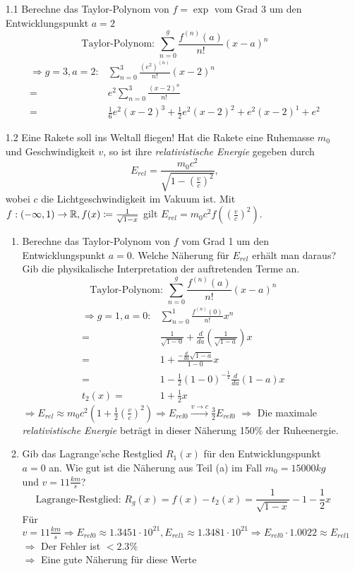 \documentclass{HM}
\begin{document}
	\begin{enumerate}
		\item[1.1] Berechne das Taylor-Polynom von $f=\exp$ vom Grad 3 um den Entwicklungspunkt $a=2$
		 $$\text{Taylor-Polynom: }\sum\limits_{n=0}^g\frac{f^{(n)}(a)}{n!}(x-a)^n$$
		 \begin{align*}
		 	\Rightarrow g=3, a=2: 
		 	&\sum\limits_{n=0}^3\frac{(e^2)^{(n)}}{n!}(x-2)^n\\
		 	=&e^2\sum\limits_{n=0}^3\frac{(x-2)^n}{n!}\\
		 	=&\frac{1}{6}e^2(x-2)^3+\frac{1}{2}e^2(x-2)^2+e^2(x-2)^1+e^2
		 \end{align*}
		 
		 \item[1.2] Eine Rakete soll ins Weltall fliegen! Hat die Rakete eine Ruhemasse $m_0$ und Geschwindigkeit $v$, so ist ihre \textit{relativistische Energie} gegeben durch
		 $$E_{rel}=\frac{m_0c^2}{\sqrt{1-(\frac{v}{c})^2}},$$
		 wobei $c$ die Lichtgeschwindigkeit im Vakuum ist. Mit $f: (-\infty,1)\to\mathbb{R}, f(x)\coloneqq\frac{1}{\sqrt{1-x}}$ gilt $E_{rel}=m_0c^2f((\frac{v}{c})^2)$.
		 \begin{enumerate}
		 	\item Berechne das Taylor-Polynom von $f$ vom Grad 1 um den Entwicklungspunkt $a=0$. Welche Näherung für $E_{rel}$ erhält man daraus? Gib die physikalische Interpretation der auftretenden Terme an.
		 	$$\text{Taylor-Polynom: }\sum\limits_{n=0}^g\frac{f^{(n)}(a)}{n!}(x-a)^n$$
		 	\begin{align*}
		 		\Rightarrow g=1, a=0:
		 		&\sum\limits_{n=0}^1\frac{f^{(n)}(0)}{n!}x^n\\
		 		=&\frac{1}{\sqrt{1-0}}+\frac{d}{da}\left(\frac{1}{\sqrt{1-a}}\right)x\\
		 		=&1+\frac{-\frac{d}{da}\sqrt{1-a}}{1-0}x\\
		 		=&1-\frac{1}{2}(1-0)^{-\frac{1}{2}}\frac{d}{da}(1-a)x\\
		 		t_2(x)=&1+\frac{1}{2}x
			\end{align*}
			$\Rightarrow E_{rel}\approx m_0c^2(1+\frac{1}{2}(\frac{v}{c})^2) \Rightarrow E_{rel0}\xrightarrow{v\to c}\frac{3}{2}E_{rel0}$
			$\Rightarrow$ Die maximale \textit{relativistische Energie} beträgt in dieser Näherung 150\% der Ruheenergie.
		 	
		 	\item Gib das Lagrange'sche Restglied $R_1(x)$ für den Entwicklungspunkt $a=0$ an. Wie gut ist die Näherung aus Teil (a) im Fall $m_0=15000kg$ und $v=11\frac{km}{s}$?
		 	$$\text{Lagrange-Restglied: }R_g(x)=f(x)-t_2(x)=\frac{1}{\sqrt{1-x}}-1-\frac{1}{2}x$$
		 	Für $v=11\frac{km}{s}\Rightarrow E_{rel0}\approx 1.3451\cdot 10^{21}, E_{rel1}\approx 1.3481\cdot 10^{21}\Rightarrow E_{rel0}\cdot 1.0022\approx E_{rel1}$\\
		 	$\Rightarrow$ Der Fehler ist $<2.3\%$\\
		 	$\Rightarrow$ Eine gute Näherung für diese Werte\\
		 	

\end{enumerate}
\end{enumerate}
\end{document}
